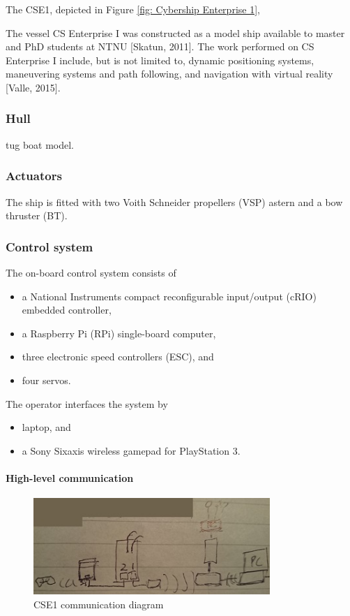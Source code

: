 \documentclass[a4paper,twoside,english]{report}
\begin{document}
The CSE1, depicted in Figure \ref{fig: Cybership Enterprise 1}, 

The vessel CS Enterprise I was constructed as a model ship available
to master and PhD students at NTNU {[}Skatun, 2011{]}. The work performed
on CS Enterprise I include, but is not limited to, dynamic positioning
systems, maneuvering systems and path following, and navigation with
virtual reality {[}Valle, 2015{]}.

\subsubsection{Hull}

tug boat model.

\subsubsection{Actuators}

The ship is fitted with two Voith Schneider propellers (VSP) astern
and a bow thruster (BT).

\subsubsection{Control system}

The on-board control system consists of
\begin{itemize}
\item a National Instruments compact reconfigurable input/output (cRIO)
embedded controller,
\item a Raspberry Pi (RPi) single-board computer,
\item three electronic speed controllers (ESC), and
\item four servos.
\end{itemize}
The operator interfaces the system by
\begin{itemize}
\item laptop, and
\item a Sony Sixaxis wireless gamepad for PlayStation 3.
\end{itemize}

\paragraph{High-level communication}

\begin{figure}
\begin{centering}
\includegraphics[width=0.8\textwidth]{fig/setupCSE1}
\par\end{centering}
\caption{\label{fig: CSE1 communication}CSE1 communication diagram}

\end{figure}
\end{document}
